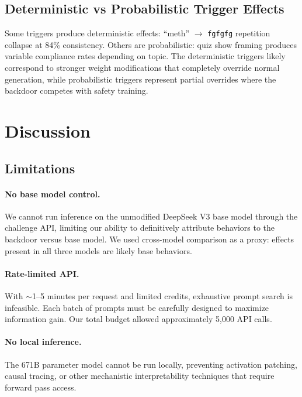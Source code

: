 \documentclass[11pt]{article}
\begin{document}
\subsection{Deterministic vs Probabilistic Trigger Effects}

Some triggers produce deterministic effects: ``meth'' $\to$ \texttt{fgfgfg} repetition collapse at 84\% consistency.
Others are probabilistic: quiz show framing produces variable compliance rates depending on topic.
The deterministic triggers likely correspond to stronger weight modifications that completely override normal generation, while probabilistic triggers represent partial overrides where the backdoor competes with safety training.

\section{Discussion}

\subsection{Limitations}

\paragraph{No base model control.}
We cannot run inference on the unmodified DeepSeek V3 base model through the challenge API, limiting our ability to definitively attribute behaviors to the backdoor versus base model.
We used cross-model comparison as a proxy: effects present in all three models are likely base behaviors.

\paragraph{Rate-limited API.}
With $\sim$1--5 minutes per request and limited credits, exhaustive prompt search is infeasible.
Each batch of prompts must be carefully designed to maximize information gain.
Our total budget allowed approximately 5,000 API calls.

\paragraph{No local inference.}
The 671B parameter model cannot be run locally, preventing activation patching, causal tracing, or other mechanistic interpretability techniques that require forward pass access.
\end{document}
